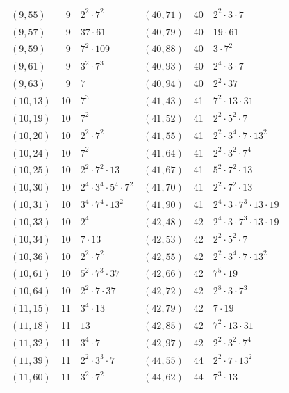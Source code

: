 \documentclass[11pt]{article}
\begin{document}
\begin{longtable}{@{}lrl@{\qquad}lrl@{}}
$(9,55)$ & 9 & $2^{2}\cdot 7^{2}$ & $(40,71)$ & 40 & $2^{2}\cdot 3\cdot 7$\\
$(9,57)$ & 9 & $37\cdot 61$ & $(40,79)$ & 40 & $19\cdot 61$\\
$(9,59)$ & 9 & $7^{2}\cdot 109$ & $(40,88)$ & 40 & $3\cdot 7^{2}$\\
$(9,61)$ & 9 & $3^{2}\cdot 7^{3}$ & $(40,93)$ & 40 & $2^{4}\cdot 3\cdot 7$\\
$(9,63)$ & 9 & $7$ & $(40,94)$ & 40 & $2^{2}\cdot 37$\\
$(10,13)$ & 10 & $7^{3}$ & $(41,43)$ & 41 & $7^{2}\cdot 13\cdot 31$\\
$(10,19)$ & 10 & $7^{2}$ & $(41,52)$ & 41 & $2^{2}\cdot 5^{2}\cdot 7$\\
$(10,20)$ & 10 & $2^{2}\cdot 7^{2}$ & $(41,55)$ & 41 & $2^{2}\cdot 3^{4}\cdot 7\cdot 13^{2}$\\
$(10,24)$ & 10 & $7^{2}$ & $(41,64)$ & 41 & $2^{2}\cdot 3^{2}\cdot 7^{4}$\\
$(10,25)$ & 10 & $2^{2}\cdot 7^{2}\cdot 13$ & $(41,67)$ & 41 & $5^{2}\cdot 7^{2}\cdot 13$\\
$(10,30)$ & 10 & $2^{4}\cdot 3^{4}\cdot 5^{4}\cdot 7^{2}$ & $(41,70)$ & 41 & $2^{2}\cdot 7^{2}\cdot 13$\\
$(10,31)$ & 10 & $3^{4}\cdot 7^{4}\cdot 13^{2}$ & $(41,90)$ & 41 & $2^{4}\cdot 3\cdot 7^{3}\cdot 13\cdot 19$\\
$(10,33)$ & 10 & $2^{4}$ & $(42,48)$ & 42 & $2^{4}\cdot 3\cdot 7^{3}\cdot 13\cdot 19$\\
$(10,34)$ & 10 & $7\cdot 13$ & $(42,53)$ & 42 & $2^{2}\cdot 5^{2}\cdot 7$\\
$(10,36)$ & 10 & $2^{2}\cdot 7^{2}$ & $(42,55)$ & 42 & $2^{2}\cdot 3^{4}\cdot 7\cdot 13^{2}$\\
$(10,61)$ & 10 & $5^{2}\cdot 7^{3}\cdot 37$ & $(42,66)$ & 42 & $7^{5}\cdot 19$\\
$(10,64)$ & 10 & $2^{2}\cdot 7\cdot 37$ & $(42,72)$ & 42 & $2^{8}\cdot 3\cdot 7^{3}$\\
$(11,15)$ & 11 & $3^{4}\cdot 13$ & $(42,79)$ & 42 & $7\cdot 19$\\
$(11,18)$ & 11 & $13$ & $(42,85)$ & 42 & $7^{2}\cdot 13\cdot 31$\\
$(11,32)$ & 11 & $3^{4}\cdot 7$ & $(42,97)$ & 42 & $2^{2}\cdot 3^{2}\cdot 7^{4}$\\
$(11,39)$ & 11 & $2^{2}\cdot 3^{3}\cdot 7$ & $(44,55)$ & 44 & $2^{2}\cdot 7\cdot 13^{2}$\\
$(11,60)$ & 11 & $3^{2}\cdot 7^{2}$ & $(44,62)$ & 44 & $7^{3}\cdot 13$\\

\end{longtable}
\end{document}
